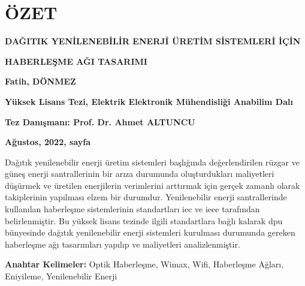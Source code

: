 

\chapter*{\vspace{2 cm}\hfill{\centering ÖZET}\hfill}
\singlespacing



\centerline{\textbf {DAĞITIK YENİLENEBİLİR ENERJİ ÜRETİM SİSTEMLERİ İÇİN}}
\centerline{\textbf {HABERLEŞME AĞI TASARIMI}}

\vspace{.5 cm}
\centerline{\textbf {Fatih, DÖNMEZ}}
\centerline{\textbf {Yüksek Lisans Tezi, Elektrik Elektronik Mühendisliği Anabilim Dalı}}
\centerline{\textbf {Tez Danışmanı: Prof. Dr. Ahmet ALTUNCU}}
\centerline{\textbf {Ağustos, 2022, \pageref{LastPage} sayfa}}

\vspace{.5 cm}
\onehalfspacing

Dağıtık yenilenebilir enerji üretim sistemleri başlığında değerlendirilen rüzgar ve güneş enerji santrallerinin bir arıza durumunda oluşturdukları maliyetleri düşürmek ve üretilen enerjilerin verimlerini arttırmak için gerçek zamanlı olarak takiplerinin yapılması elzem bir durumdur. Yenilenebilir enerji santrallerinde kullanılan haberleşme sistemlerinin standartları \gls{iec} ve \gls{ieee} tarafından belirlenmiştir.
Bu yüksek lisans tezinde ilgili standartlara bağlı kalarak \gls{dpu} bünyesinde dağıtık yenilenebilir enerji sistemleri kurulması durumunda gereken haberleşme ağı tasarımları yapılıp ve maliyetleri analizlenmiştir.

\begin{comment}
Bu yüksek lisans çalışmasında, dağıtık yenilenebilir enerji üretim sistemlerindeki sensör verilerinin merkezden gerçek zamanlı olarak incelenebilinmesi ve ilgili haberleşme standartlarının sağlandığı ağ

\end{comment}

\textbf{Anahtar Kelimeler: } Optik Haberleşme, Wimax, Wifi, Haberleşme Ağları, Eniyileme, Yenilenebilir Enerji 

